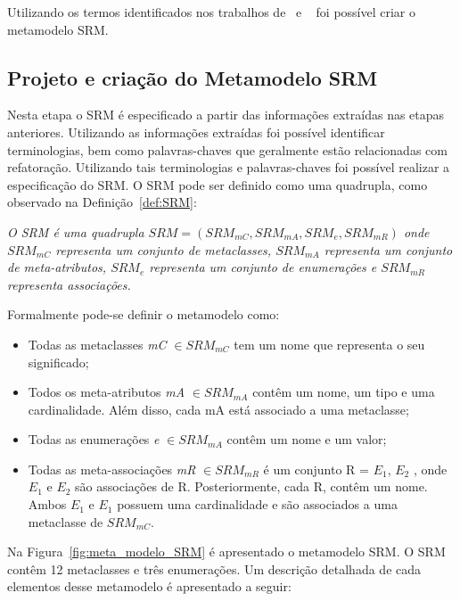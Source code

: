 Utilizando os termos identificados nos trabalhos de~ e ~ foi possível criar o metamodelo SRM. 

\subsection{Projeto e criação do Metamodelo SRM}

Nesta etapa o SRM é especificado a partir das informações extraídas nas etapas anteriores. Utilizando as informações extraídas foi possível identificar terminologias, bem como palavras-chaves que geralmente estão relacionadas com refatoração. Utilizando tais terminologias e palavras-chaves foi possível realizar a especificação do SRM. O SRM pode ser definido como uma quadrupla, como observado na Definição~\ref{def:SRM}: 


\begin{definicao}\label{def:SRM}
    \textit{O SRM é uma quadrupla $SRM = (SRM_{mC}, SRM_{mA}, SRM_{e}, SRM_{mR})$ onde $SRM_{mC} $ representa um conjunto de metaclasses, $SRM_{mA}$ representa um conjunto de meta-atributos, $SRM_{e}$ representa um conjunto de enumerações e $SRM_{mR}$ representa associações.}
\end{definicao}

Formalmente pode-se definir o metamodelo como:

\begin{itemize}
	\item Todas as metaclasses \textit{mC} $\in SRM_{mC}$ tem um nome que representa o seu significado;
	\item Todos os meta-atributos \textit{mA} $\in SRM_{mA}$ contêm um nome, um tipo e uma cardinalidade. Além disso, cada mA está associado a uma metaclasse;
	\item Todas as enumerações \textit{e} $\in SRM_{mA}$ contêm um nome e um valor;
	\item Todas as meta-associações \textit{mR} $\in SRM_{mR}$ é um conjunto R = $E_{1}$, $E_{2}$  , onde  $E_{1}$ e $E_{2}$ são associações de R. Posteriormente, cada R, contêm um nome. Ambos $E_{1}$  e $E_{1}$ possuem uma cardinalidade e são associados a uma metaclasse de $SRM_{mC}$.
\end{itemize}

Na Figura~\ref{fig:meta_modelo_SRM} é apresentado o metamodelo SRM. O SRM contêm 12 metaclasses e três enumerações. Um descrição detalhada de cada elementos desse metamodelo é apresentado a seguir:

